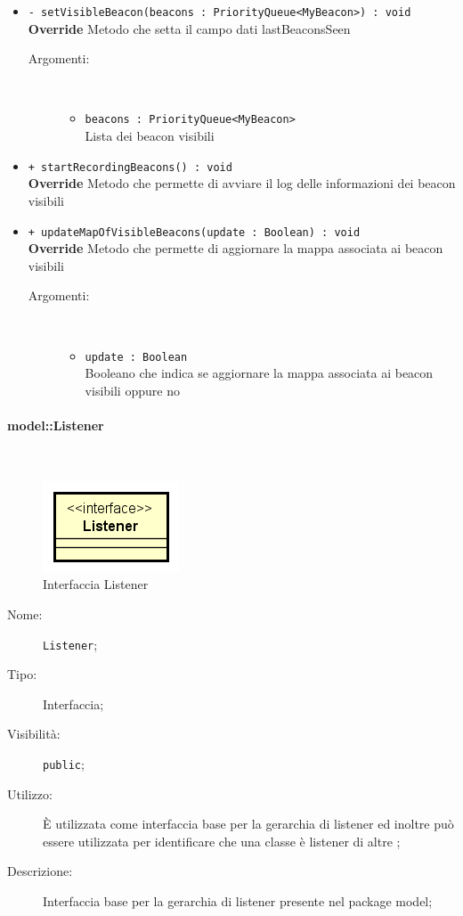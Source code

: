 \documentclass[../DefinizioneDiProdotto.tex]{subfiles}
\begin{document}
\begin{description}
\begin{itemize}
\begin{description}
		\end{description}
		\item \texttt{- setVisibleBeacon(beacons : PriorityQueue<MyBeacon>) : void}\\
		\textbf{Override} Metodo che setta il campo dati lastBeaconsSeen
		\begin{description}
			\item[Argomenti:] \
			\begin{itemize}
				\item \texttt{beacons : PriorityQueue<MyBeacon>}\\
				Lista dei beacon visibili\end{itemize}
		\end{description}
		\item \texttt{+ startRecordingBeacons() : void}\\
		\textbf{Override} Metodo che permette di avviare il log delle informazioni dei beacon visibili
		\item \texttt{+ updateMapOfVisibleBeacons(update : Boolean) : void}\\
		\textbf{Override} Metodo che permette di aggiornare la mappa associata ai beacon visibili
		\begin{description}
			\item[Argomenti:] \
			\begin{itemize}
				\item \texttt{update : Boolean}\\
				Booleano che indica se aggiornare la mappa associata ai beacon visibili oppure no\end{itemize}
		\end{description}
	\end{itemize}
\end{description}

\paragraph{model::Listener}
\
\begin{figure}[H]
	\centering
	\includegraphics[width=\maxwidth]{img/Listener.png}
	\caption{Interfaccia Listener}\label{fig:model::Listener} 
\end{figure}
\begin{description}
	\item[Nome:] \texttt{Listener};
	\item[Tipo:] Interfaccia;
	\item[Visibilità:] \texttt{public};
	\item[Utilizzo:] È utilizzata come interfaccia base per la gerarchia di listener ed inoltre può essere utilizzata per identificare che una classe è listener di altre ;
	\item[Descrizione:] Interfaccia base per la gerarchia di listener presente nel package model;
\end{description}
\end{document}

